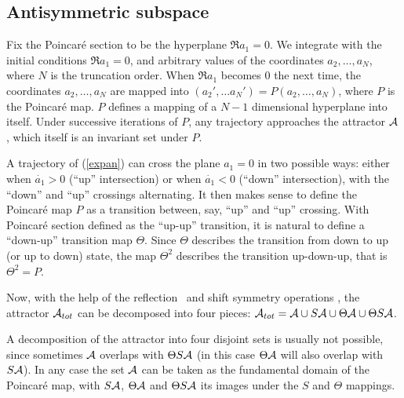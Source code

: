 \subsection{Antisymmetric subspace} 
\label{s:AntisymmSubsp}

Fix the  Poincar\'e section to be the hyperplane
$\Re a_1=0$. We integrate  with the initial
 conditions
$\Re a_1=0$, and arbitrary values of the coordinates  $a_2, \ldots, a_N$, where
$N$ is the truncation order.  When $\Re a_1$ becomes
$0$ the next time,  the coordinates  $a_2, \ldots, a_N$ are mapped
into $(a_2', \ldots a_N')=P(a_2, \ldots, a_N)$, where $P$ is the  Poincar\'e
map. $P$ defines a mapping of a $N-1$ dimensional hyperplane into itself.
Under successive iterations of  $P$, any trajectory
approaches the attractor ${\cal A}$, which itself is an invariant
set under $P$.

A trajectory of
 (\ref{expan}) can cross the plane $a_1=0$ in two possible ways:
 either when
$\dot{a_1}>0$ (``up'' intersection)
or when  $\dot{a_1}<0$ (``down'' intersection),
 with the ``down'' and ``up'' crossings
alternating.
It then makes sense to define the  Poincar\'e map $P$ as a transition between,
say, ``up'' and ``up'' crossing.
With  Poincar\'e section defined as the ``up-up'' transition,
it is natural to define a ``down-up'' transition map $\Theta$. Since
$\Theta$ describes the transition from down to up (or up to down) state,
the map $\Theta^2$ describes the transition  up-down-up, that is
$\Theta^2=P$.

Now, with the help of the 
reflection \Refl\ and shift symmetry {\Shift}
operations
,
the  attractor ${\cal A}_{tot}$ can be decomposed into four pieces:
 ${\cal A}_{tot}={\cal A} \cup S {\cal A}  \cup \Theta {\cal A}
  \cup \Theta S {\cal A} $. 

A decomposition
of the attractor into four disjoint sets
is usually not possible, since sometimes $ {\cal A}$ overlaps with
$\Theta S{\cal A} $ (in this case $\Theta  {\cal A}$ will also  overlap with
$S {\cal A} $).
In any case  the set $ {\cal A}$ can be taken as
the fundamental
domain of the Poincar{\'e} map, with $S  {\cal A} $,
$\Theta  {\cal A} $ and $\Theta S  {\cal A} $ its images under the
$S$ and $\Theta$ mappings.



